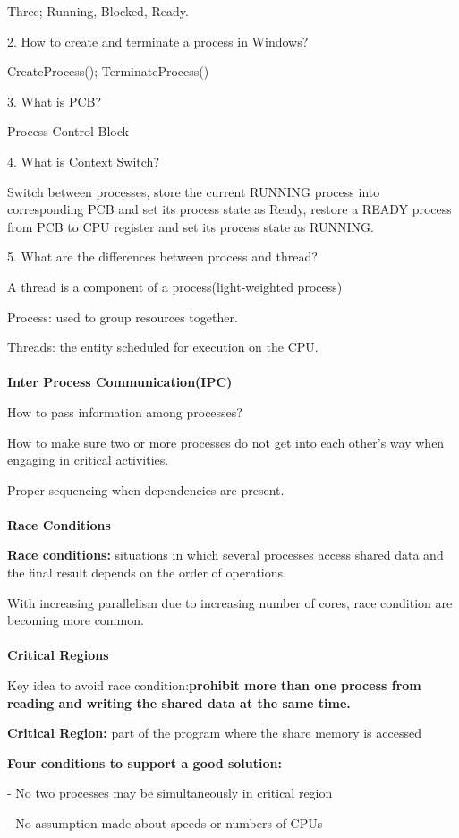 \documentclass[]{report}
\begin{document}
Three; Running, Blocked, Ready.

2. How to create and terminate a process in Windows?

CreateProcess(); TerminateProcess()

3. What is PCB?

Process Control Block

4. What is Context Switch?

Switch between processes, store the current RUNNING process into corresponding PCB and set its process state as Ready, restore a READY process from PCB to CPU register and set its process state as RUNNING.

5. What are the differences between process and thread?

A thread is a component of a process(light-weighted process)

Process: used to group resources together.

Threads: the entity scheduled for execution on the CPU.\\\\
\textbf{Inter Process Communication(IPC)}

How to pass information among processes?

How to make sure two or more processes do not
get into each other’s way when engaging in critical
activities.

Proper sequencing when dependencies are present.\\\\
\textbf{Race Conditions}

\textbf{Race conditions:} situations in which several
processes access shared data and the final result
depends on the order of operations.

With increasing parallelism due to increasing
number of cores, race condition are becoming more
common.\\\\
\textbf{Critical Regions}

Key idea to avoid race
condition:\textbf{prohibit
more than one process
from reading and
writing the shared data
at the same time.}

\textbf{Critical Region:} part of
the program where the
share memory is accessed

\textbf{Four conditions to support a good solution:}

- No two processes may be simultaneously in critical region

- No assumption made about speeds or numbers of CPUs
\end{document}
